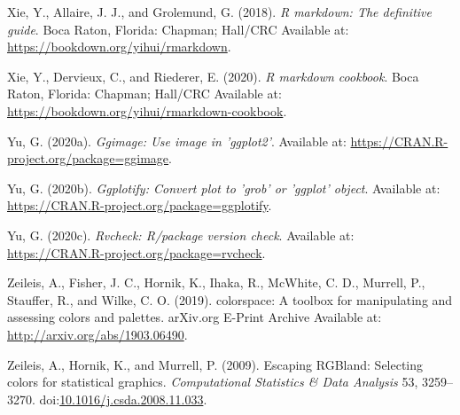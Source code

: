 \documentclass[utf8]{frontiersSCNS}
\newlength{\cslhangindent}
\newenvironment{cslreferences}%
  {\setlength{\parindent}{0pt}%
  \everypar{\setlength{\hangindent}{\cslhangindent}}\ignorespaces}%
  {\par}
\begin{document}
\begin{cslreferences}
\leavevmode\hypertarget{ref-xie2018markdown}{}%
Xie, Y., Allaire, J. J., and Grolemund, G. (2018). \emph{R markdown: The
definitive guide}. Boca Raton, Florida: Chapman; Hall/CRC Available at:
\url{https://bookdown.org/yihui/rmarkdown}.

\leavevmode\hypertarget{ref-xie2020markdown}{}%
Xie, Y., Dervieux, C., and Riederer, E. (2020). \emph{R markdown
cookbook}. Boca Raton, Florida: Chapman; Hall/CRC Available at:
\url{https://bookdown.org/yihui/rmarkdown-cookbook}.

\leavevmode\hypertarget{ref-yu2020ggimage}{}%
Yu, G. (2020a). \emph{Ggimage: Use image in 'ggplot2'}. Available at:
\url{https://CRAN.R-project.org/package=ggimage}.

\leavevmode\hypertarget{ref-yu2020ggplotify}{}%
Yu, G. (2020b). \emph{Ggplotify: Convert plot to 'grob' or 'ggplot'
object}. Available at:
\url{https://CRAN.R-project.org/package=ggplotify}.

\leavevmode\hypertarget{ref-yu2020rvcheck}{}%
Yu, G. (2020c). \emph{Rvcheck: R/package version check}. Available at:
\url{https://CRAN.R-project.org/package=rvcheck}.

\leavevmode\hypertarget{ref-zeileis2019colorspace}{}%
Zeileis, A., Fisher, J. C., Hornik, K., Ihaka, R., McWhite, C. D.,
Murrell, P., Stauffer, R., and Wilke, C. O. (2019). colorspace: A
toolbox for manipulating and assessing colors and palettes. arXiv.org
E-Print Archive Available at: \url{http://arxiv.org/abs/1903.06490}.

\leavevmode\hypertarget{ref-zeileis2009escaping}{}%
Zeileis, A., Hornik, K., and Murrell, P. (2009). Escaping RGBland:
Selecting colors for statistical graphics. \emph{Computational
Statistics \& Data Analysis} 53, 3259--3270.
doi:\href{https://doi.org/10.1016/j.csda.2008.11.033}{10.1016/j.csda.2008.11.033}.
\end{cslreferences}
\end{document}
